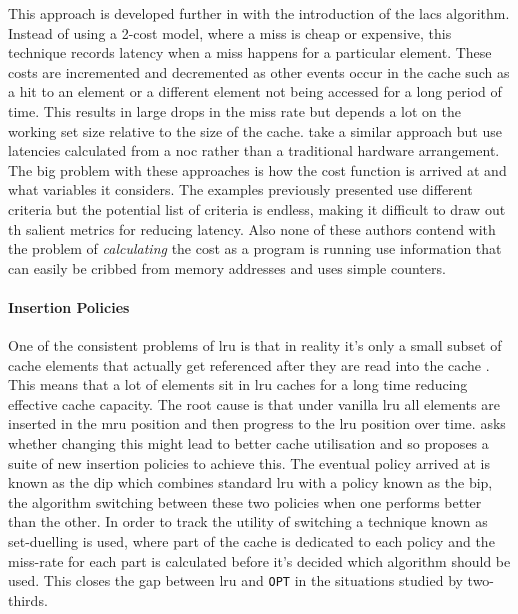 This approach is developed further in \citet{kharbutliLACSLocalityAwareCostSensitive2014} with the introduction of the \gls{lacs} algorithm. Instead of using a 2-cost model, where a miss is cheap or expensive, this technique records latency when a miss happens for a particular element. These costs are incremented and decremented as other events occur in the cache such as a hit to an element or a different element not being accessed for a long period of time. This results in large drops in the miss rate but depends a lot on the working set size relative to the size of the cache. \citet{dasLatencyAwareBlock2017} take a similar approach but use latencies calculated from a \gls{noc} rather than a traditional hardware arrangement. The big problem with these approaches is how the cost function is arrived at and what variables it considers. The examples previously presented use different criteria but the potential list of criteria is endless, making it difficult to draw out th salient metrics for reducing latency. Also none of these authors contend with the problem of \emph{calculating} the cost as a program is running \citet{jeongCostsensitiveCacheReplacement2003} use information that can easily be cribbed from memory addresses and \citet{kharbutliLACSLocalityAwareCostSensitive2014} uses simple counters.

\paragraph{Insertion Policies}

One of the consistent problems of \gls{lru} is that in reality it's only a small subset of cache elements that actually get referenced after they are read into the cache \cite{qureshiAdaptiveInsertionPolicies2007}. This means that a lot of elements sit in \gls{lru} caches for a long time reducing effective cache capacity. The root cause is that under vanilla \gls{lru} all elements are inserted in the \gls{mru} position and then progress to the \gls{lru} position over time. \citeauthor{qureshiAdaptiveInsertionPolicies2007} \cite{qureshiAdaptiveInsertionPolicies2007, qureshiSetDuelingControlledAdaptiveInsertion2008} asks whether changing this might lead to better cache utilisation and so proposes a suite of new insertion policies to achieve this. The eventual policy arrived at is known as the \gls{dip} which combines standard \gls{lru} with a policy known as the \gls{bip}, the algorithm switching between these two policies when one performs better than the other. In order to track the utility of switching a technique known as set-duelling is used, where part of the cache is dedicated to each policy and the miss-rate for each part is calculated before it's decided which algorithm should be used. This closes the gap between \gls{lru} and \texttt{OPT} in the situations studied by two-thirds.

